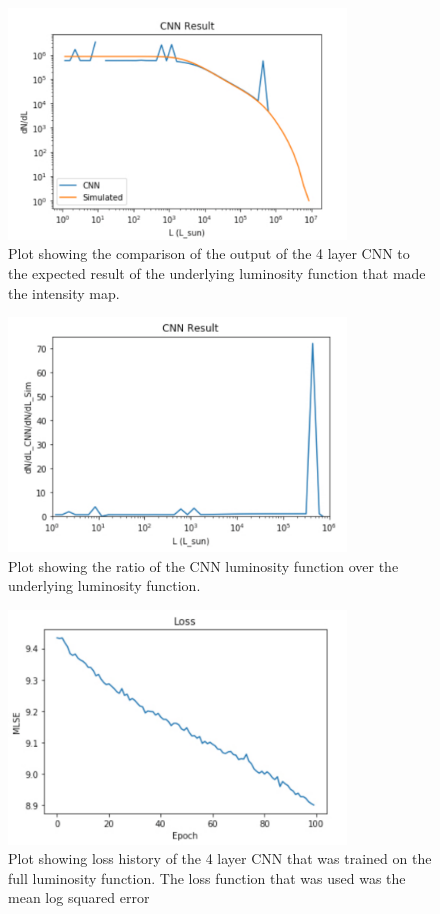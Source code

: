 \documentclass{article}
\begin{document}
			\begin{figure}[H]
				\centering
				\includegraphics[width=0.8\textwidth]{CNN_4_layer.pdf}
				\caption{Plot showing the comparison of the output of the 4 layer CNN to the expected result of the underlying luminosity function that made the intensity map.}
				\label{fig:CNN_4_layer}
			\end{figure}

			\begin{figure}[H]
				\centering
				\includegraphics[width=0.8\textwidth]{CNN_4_layer_ratio.pdf}
				\caption{Plot showing the ratio of the CNN luminosity function over the underlying luminosity function.}
				\label{fig:CNN_4_layer_ratio}
			\end{figure}

			\begin{figure}[H]
				\centering
				\includegraphics[width=0.8\textwidth]{CNN_4_layer_history_mlse.pdf}
				\caption{Plot showing loss history of the 4 layer CNN that was trained on the full luminosity function.  The loss function that was used was the mean log squared error}
				\label{fig:CNN_4_layer_history_mlse}
			\end{figure}
\end{document}
